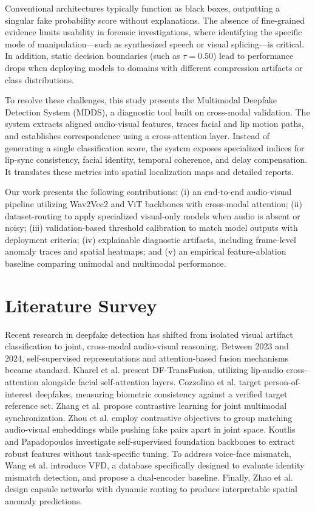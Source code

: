 \documentclass[conference]{IEEEtran}
\begin{document}
Conventional architectures typically function as black boxes, outputting a singular fake probability score without explanations. The absence of fine-grained evidence limits usability in forensic investigations, where identifying the specific mode of manipulation—such as synthesized speech or visual splicing—is critical. In addition, static decision boundaries (such as $\tau = 0.50$) lead to performance drops when deploying models to domains with different compression artifacts or class distributions. 

To resolve these challenges, this study presents the Multimodal Deepfake Detection System (MDDS), a diagnostic tool built on cross-modal validation. The system extracts aligned audio-visual features, traces facial and lip motion paths, and establishes correspondence using a cross-attention layer. Instead of generating a single classification score, the system exposes specialized indices for lip-sync consistency, facial identity, temporal coherence, and delay compensation. It translates these metrics into spatial localization maps and detailed reports.

Our work presents the following contributions: (i) an end-to-end audio-visual pipeline utilizing Wav2Vec2 and ViT backbones with cross-modal attention; (ii) dataset-routing to apply specialized visual-only models when audio is absent or noisy; (iii) validation-based threshold calibration to match model outputs with deployment criteria; (iv) explainable diagnostic artifacts, including frame-level anomaly traces and spatial heatmaps; and (v) an empirical feature-ablation baseline comparing unimodal and multimodal performance.

\section{Literature Survey}
Recent research in deepfake detection has shifted from isolated visual artifact classification to joint, cross-modal audio-visual reasoning. Between 2023 and 2024, self-supervised representations and attention-based fusion mechanisms became standard. Kharel et al. \cite{kharel2023dftransfusion} present DF-TransFusion, utilizing lip-audio cross-attention alongside facial self-attention layers. Cozzolino et al. \cite{cozzolino2023audiovisual} target person-of-interest deepfakes, measuring biometric consistency against a verified target reference set. Zhang et al. \cite{pvass2023mdd} propose contrastive learning for joint multimodal synchronization. Zhou et al. \cite{zhou2023joint} employ contrastive objectives to group matching audio-visual embeddings while pushing fake pairs apart in joint space. Koutlis and Papadopoulos \cite{koutlis2024investigating} investigate self-supervised foundation backbones to extract robust features without task-specific tuning. To address voice-face mismatch, Wang et al. \cite{wang2024vfd} introduce VFD, a database specifically designed to evaluate identity mismatch detection, and propose a dual-encoder baseline. Finally, Zhao et al. \cite{zhao2024interpretable} design capsule networks with dynamic routing to produce interpretable spatial anomaly predictions.
\end{document}
